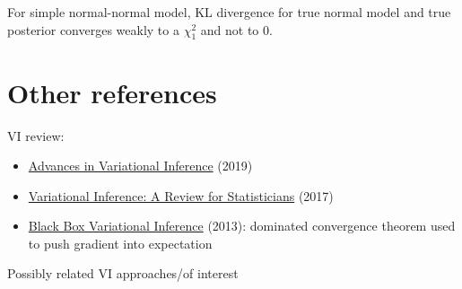 \documentclass[10pt]{article}
\begin{document}
For simple normal-normal model, KL divergence for true normal model and true posterior converges weakly to a $\chi_1^2$ and not to 0.


\newpage


\section{Other references}

VI review:
\begin{itemize}
\item
\href{https://s3.amazonaws.com/ieeecs.cdn.csdl.content/trans/tp/2019/08/08588399.pdf?AWSAccessKeyId=ASIA2Z6GPE73ITPNF4HV&Expires=1646432232&Signature=%2BwbeAhSyM%2FMqzaAhLaunhuq30BI%3D&x-amz-security-token=IQoJb3JpZ2luX2VjEP7%2F%2F%2F%2F%2F%2F%2F%2F%2F%2FwEaCXVzLWVhc3QtMSJGMEQCIGoE%2FVHY77X2Kpq0J47Ic29AHEKJ%2F%2FS0foSv98aaP%2F%2BxAiAYu9FImOV6wjyu7v9HkfGlfyytEvSd2wujoh7wIivaTyqdAghmEAAaDDc0MjkwODcwMDY2MiIMYEqAQr9DL2OWCGlbKvoB58nRjaBdUqwysmhAcnlM2JP60usEfHlgP0Bn2xGYd1kZJPiEKzmA%2F76Bo7YRZ2z%2FpCEaHPV7aFI6ikqSiJToz5QlGqPUQp5GF6qR5TSKEJ5oMTODfVyUt5xdcYOww012wn%2FyqAE3T9hRTF%2FyxhZeY6Q1xrj3Bzu8p0jP7NO30Xoje2Oct8JA6sOwhgFEL5rjtIpPoiiAywnSeWz8Ia8ra4tpCOPbG8T3SLq%2BFE4SS3BrviPuGWH0b0vr2EzBSZEoWFySA87d27hh99%2B%2BsLKLvcu4u3VGRUWb%2FpwIYAT88MBxL1RhCazyRj4eByB%2FsbVAhmGQ0bYAYYZT1TDqhYqRBjqbAcZHTiSLr48H4Ha2O6bVtVfH9%2B8e%2FmWAg2joY8DUAAvhdiGeqGLdPfgpNE0%2BpXfJI%2BKR8LeVrJvtfpYI3LV2RQn%2B3y2cnzIrosiNxE68tL4U%2BsW4uor4O6eZ8qvF%2Bvr7ncAy4rulMRlaqpgY%2FehIGk5UxsUPTr4zC%2BYNJXlKu28DlNal14YG5ugTN3VC5sgxL%2B%2Bq%2BEp8ibbwRzSf}{Advances in Variational Inference} (2019)
\item
\href{https://www.tandfonline.com/doi/full/10.1080/01621459.2017.1285773}{Variational Inference: A Review for Statisticians} (2017)
\item
\href{https://arxiv.org/pdf/1401.0118.pdf}{Black Box Variational Inference} (2013): dominated convergence theorem used to push gradient into expectation
\end{itemize}
Possibly related VI approaches/of interest
\end{document}
